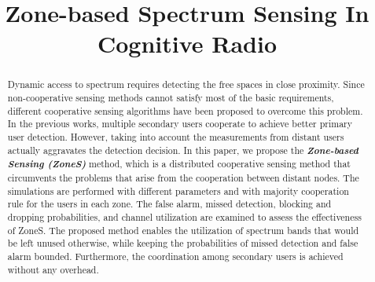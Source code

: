 \documentclass[conference,compsoc]{IEEEtran}
\begin{document}
\title{Zone-based Spectrum Sensing In Cognitive Radio}


\IEEEoverridecommandlockouts
\author{
  }








\maketitle

\begin{abstract}
Dynamic access to spectrum requires detecting the free spaces in close proximity. Since non-cooperative sensing methods cannot satisfy most of the basic requirements, different cooperative sensing algorithms have been proposed to overcome this problem. In the previous works, multiple secondary users cooperate to achieve better primary user detection. However, taking into account the measurements from distant users actually aggravates the detection decision. In this paper, we propose the \textbf{\textit{Zone-based Sensing (ZoneS)}} method, which is a distributed cooperative sensing method that circumvents the problems that arise from the cooperation between distant nodes. The simulations are performed with different parameters and with majority cooperation rule for the users in each zone. The false alarm, missed detection, blocking and dropping probabilities, and channel utilization are examined to assess the effectiveness of ZoneS. The proposed method enables the utilization of spectrum bands that would be left unused otherwise, while keeping the probabilities of missed detection and false alarm bounded. Furthermore, the coordination among secondary users is achieved without any overhead.
\end{abstract}
\end{document}
